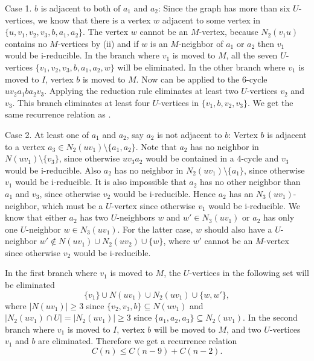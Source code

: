 \documentclass{elsart_TR2}
\begin{document}
\vspace{-0mm}\vspace{-0mm}

Case 1. $b$ is adjacent to both of $a_1$ and $a_2$:
Since the graph has more than six $U$-vertices,
we know that there is a vertex $w$ adjacent to some vertex in
$\{u,v_1,v_2,v_3,b,a_1,a_2\}$.
The vertex $w$ cannot be an $M$-vertex,
 because $N_2(v_1u)$  contains no $M$-vertices by (ii)
and if $w$ is an $M$-neighbor of $a_1$ or $a_2$ then $v_1$ would be i-reducible.
In the branch where $v_1$ is moved to $M$,
all the seven $U$-vertices $\{v_1,v_2,v_3,b,a_1,a_2, w\}$ will be eliminated.
In the other branch where $v_1$ is moved to $I$, vertex $b$ is moved to $M$.
Now  can be applied to the 6-cycle $uv_2a_1ba_2v_3$.
Applying the reduction rule  eliminates at least two $U$-vertices $v_2$ and $v_3$.
This branch eliminates at least four $U$-vertices in $\{v_1,b,v_2,v_3\}$.
We get the same recurrence relation as .


Case 2. At least one of $a_1$ and $a_2$, say $a_2$ is not adjacent to $b$:
Vertex $b$ is adjacent to a vertex $a_3\in N_2(uv_1)\setminus \{a_1,a_2\}$.
Note that $a_2$ has no neighbor in $N(uv_1)\setminus \{v_3\}$,
since otherwise $uv_3a_2$ would be contained in a 4-cycle and $v_3$ would be i-reducible.
Also $a_2$ has no neighbor  in $N_2(uv_1)\setminus \{a_1\}$, since otherwise $v_1$ would be i-reducible.
It is also impossible that $a_2$ has no other neighbor than $a_1$ and $v_3$, since otherwise $v_2$ would be i-reducible.
Hence  $a_2$ has an $N_3(uv_1)$-neighbor, which must be
a $U$-vertex since otherwise $v_1$ would be i-reducible.
We know that either $a_2$ has two $U$-neighbors $w$ and $w'\in N_3(uv_1)$ or $a_2$ has only one $U$-neighbor $w\in N_3(uv_1)$.
For the latter case, $w$ should also have a $U$-neighbor $w'\not\in N(uv_1)\cup N_2(uv_2)\cup \{w\}$,
where $w'$ cannot be an $M$-vertex since otherwise $v_2$ would be i-reducible.


In the first branch where $v_1$ is moved to $M$, the $U$-vertices in the following set will be eliminated
$$\{v_1\}\cup N(uv_1) \cup N_2(uv_1)\cup \{w,w'\},$$
where $|N(uv_1)|\geq 3$ since $\{v_2,v_3,b\}\subseteq N(uv_1)$ and $|N_2(uv_1)\cap U|=|N_2(uv_1)|\geq 3$ since $\{a_1,a_2, a_3\}\subseteq N_2(uv_1)$.
In the second branch where $v_1$ is moved to $I$, vertex $b$ will be moved to $M$, and
two $U$-vertices $v_1$ and $b$ are  eliminated.
Therefore we get a recurrence relation
$$C(n)\leq C(n-9)+C(n-2).$$
\end{document}

